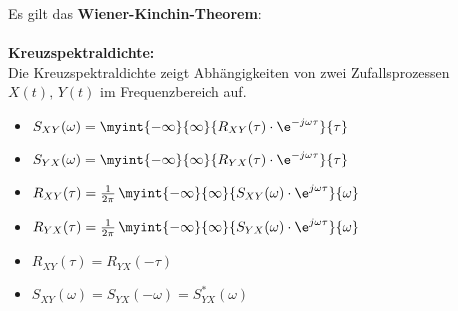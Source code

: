 			\begin{minipage}{\textwidth}
					Es gilt das \textbf{Wiener-Kinchin-Theorem}:\\[0.2cm]
					\\[0.4cm]
					\textbf{Kreuzspektraldichte:}\\[0.1cm]
					Die Kreuzspektraldichte zeigt Abhängigkeiten von zwei Zufallsprozessen $X(t),\,Y(t)$ im Frequenzbereich auf.\\[-0.3cm]
					\begin{itemize}
						\item $S_{XY}(\omega) = \myint{-\infty}{\infty}{R_{XY}(\tau)\cdot \e^{-j\omega\tau}}{\tau}$\\[-0.15cm]
						\item $S_{YX}(\omega) = \myint{-\infty}{\infty}{R_{YX}(\tau)\cdot \e^{-j\omega\tau}}{\tau}$\\[-0.15cm]
						\item $R_{XY}(\tau) = \frac{1}{2\pi}\,\myint{-\infty}{\infty}{S_{XY}(\omega)\cdot \e^{j\omega\tau}}{\omega}$\\[-0.15cm]
						\item $R_{YX}(\tau) = \frac{1}{2\pi}\,\myint{-\infty}{\infty}{S_{YX}(\omega)\cdot \e^{j\omega\tau}}{\omega}$\\[-0.15cm]
						\item $R_{XY}(\tau) = R_{YX}(-\tau)$\\[-0.15cm]
						\item $S_{XY}(\omega) = S_{YX}(-\omega) = S_{YX}^*(\omega)$
					\end{itemize}
			\end{minipage}$ $\\[0.1cm]

